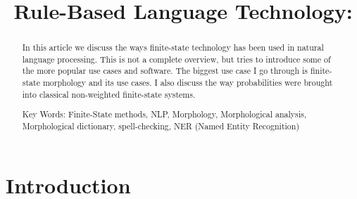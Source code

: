 \documentclass[free]{flammie}
\newif\ifcameraready
\begin{document}
\title{Rule-Based Language Technology:  }


\ifcameraready
\author{Flammie A Pirinen\\
Department of Language and Culture / Divvun\\
NO-9019 UiT Norgga árktalaš universitehta\\
\url{Flammie.pirinen@uit.no}
}
\fi

\maketitle
\begin{abstract}
In this article we discuss the ways finite-state technology has been used in
    natural language processing. This is not a complete overview, but tries to
    introduce some of the more popular use cases and software. The biggest use
    case I go through is finite-state morphology and its use cases. I also
    discuss the way probabilities were brought into classical non-weighted
    finite-state systems.

    Key Words: Finite-State methods, NLP, Morphology, Morphological analysis,
Morphological dictionary, spell-checking, NER (Named Entity Recognition)
\end{abstract}

\section{Introduction}
\end{document}
